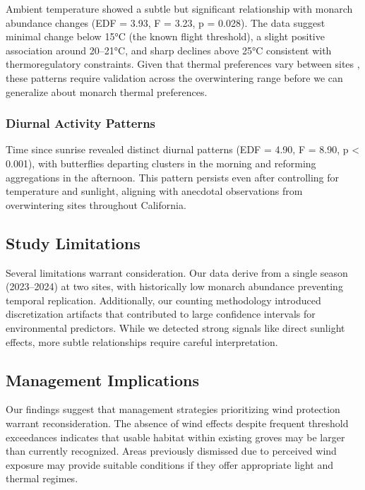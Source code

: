 Ambient temperature showed a subtle but significant relationship with monarch abundance changes (EDF = 3.93, F = 3.23, p = 0.028). The data suggest minimal change below 15°C (the known flight threshold), a slight positive association around 20--21°C, and sharp declines above 25°C consistent with thermoregulatory constraints. Given that thermal preferences vary between sites \autocite{Saniee2022_3VN7I68M}, these patterns require validation across the overwintering range before we can generalize about monarch thermal preferences.

\subsubsection{Diurnal Activity Patterns}

Time since sunrise revealed distinct diurnal patterns (EDF = 4.90, F = 8.90, p < 0.001), with butterflies departing clusters in the morning and reforming aggregations in the afternoon. This pattern persists even after controlling for temperature and sunlight, aligning with anecdotal observations from overwintering sites throughout California.

\subsection{Study Limitations}

Several limitations warrant consideration. Our data derive from a single season (2023--2024) at two sites, with historically low monarch abundance preventing temporal replication. Additionally, our counting methodology introduced discretization artifacts that contributed to large confidence intervals for environmental predictors. While we detected strong signals like direct sunlight effects, more subtle relationships require careful interpretation.

\subsection{Management Implications}

Our findings suggest that management strategies prioritizing wind protection warrant reconsideration. The absence of wind effects despite frequent threshold exceedances indicates that usable habitat within existing groves may be larger than currently recognized. Areas previously dismissed due to perceived wind exposure may provide suitable conditions if they offer appropriate light and thermal regimes.

